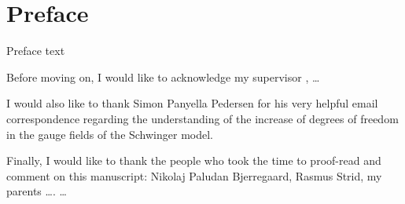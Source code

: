 \documentclass[../main.tex]{subfiles} %
\begin{document}
\chapter*{Preface}

Preface text


Before moving on, I would like to acknowledge my supervisor \Supervisor, \ldots

I would also like to thank Simon Panyella Pedersen for his very helpful email correspondence regarding the understanding of the increase of degrees of freedom in the gauge fields of the Schwinger model.

Finally, I would like to thank the people who took the time to proof-read and comment on this manuscript: Nikolaj Paludan Bjerregaard, Rasmus Strid, my parents \ldots. \ldots




\end{document}
